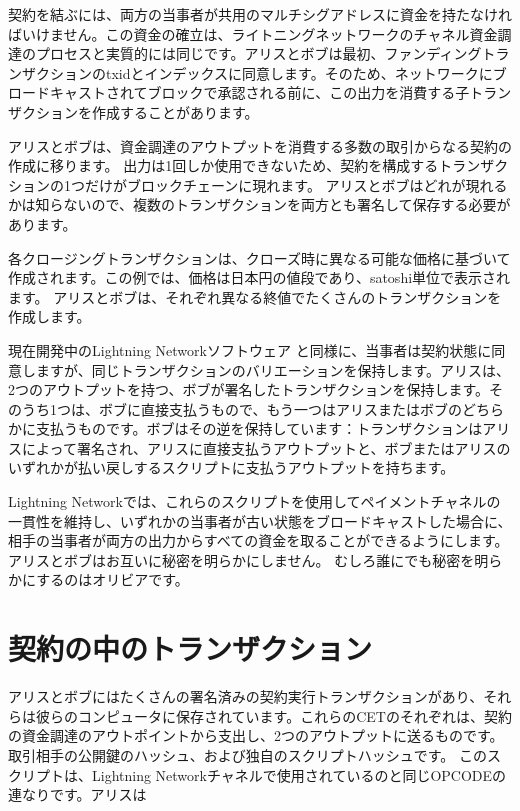 \documentclass[11pt]{article}
\begin{document}
契約を結ぶには、両方の当事者が共用のマルチシグアドレスに資金を持たなければいけません。この資金の確立は、ライトニングネットワークのチャネル資金調達のプロセスと実質的には同じです。アリスとボブは最初、ファンディングトランザクションのtxidとインデックスに同意します。そのため、ネットワークにブロードキャストされてブロックで承認される前に、この出力を消費する子トランザクションを作成することがあります。

アリスとボブは、資金調達のアウトプットを消費する多数の取引からなる契約の作成に移ります。 出力は1回しか使用できないため、契約を構成するトランザクションの1つだけがブロックチェーンに現れます。 アリスとボブはどれが現れるかは知らないので、複数のトランザクションを両方とも署名して保存する必要があります。

各クロージングトランザクションは、クローズ時に異なる可能な価格に基づいて作成されます。この例では、価格は日本円の値段であり、satoshi単位で表示されます。 アリスとボブは、それぞれ異なる終値でたくさんのトランザクションを作成します。

現在開発中のLightning Networkソフトウェア \cite{lnpaper} と同様に、当事者は契約状態に同意しますが、同じトランザクションのバリエーションを保持します。アリスは、2つのアウトプットを持つ、ボブが署名したトランザクションを保持します。そのうち1つは、ボブに直接支払うもので、もう一つはアリスまたはボブのどちらかに支払うものです。ボブはその逆を保持しています：トランザクションはアリスによって署名され、アリスに直接支払うアウトプットと、ボブまたはアリスのいずれかが払い戻しするスクリプトに支払うアウトプットを持ちます。

Lightning Networkでは、これらのスクリプトを使用してペイメントチャネルの一貫性を維持し、いずれかの当事者が古い状態をブロードキャストした場合に、相手の当事者が両方の出力からすべての資金を取ることができるようにします。 アリスとボブはお互いに秘密を明らかにしません。 むしろ誰にでも秘密を明らかにするのはオリビアです。


\section*{契約の中のトランザクション}

アリスとボブにはたくさんの署名済みの契約実行トランザクションがあり、それらは彼らのコンピュータに保存されています。これらのCETのそれぞれは、契約の資金調達のアウトポイントから支出し、2つのアウトプットに送るものです。取引相手の公開鍵のハッシュ、および独自のスクリプトハッシュです。 このスクリプトは、Lightning Networkチャネルで使用されているのと同じOPCODEの連なりです。アリスは
\end{document}
